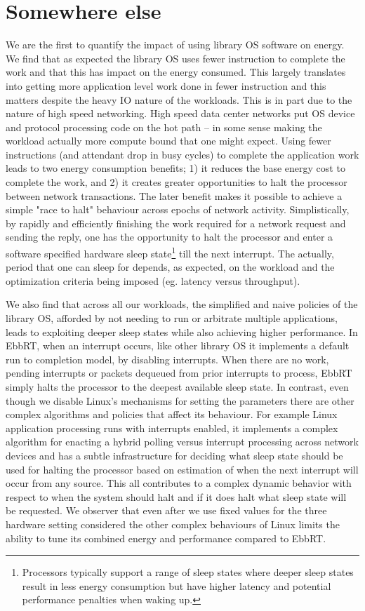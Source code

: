 \section{Somewhere else}
We are the first to quantify the impact of using library OS software on energy.  We find that as expected the library OS uses fewer instruction to complete the work and that this has impact on the energy consumed.  This largely translates into getting more application level work done in fewer instruction and this matters despite the heavy IO nature of the workloads.  This is in part due to the nature of high speed networking.  High speed data center networks put OS device and protocol processing code on the hot path -- in some sense making the workload actually more compute bound that one might expect.  Using fewer instructions (and attendant drop in busy cycles) to complete the application work leads to two energy consumption benefits; 1) it reduces the base energy cost to complete the work, and 2) it creates greater opportunities to halt the processor between network transactions.  The later benefit makes it possible to achieve a simple "race to halt" behaviour across epochs of network activity.  
Simplistically, by rapidly and efficiently finishing the work required for a network request and sending the reply, one has the opportunity to halt the processor and enter a software specified hardware sleep state\footnote{Processors typically support a range of sleep states where deeper sleep states result in less energy consumption but have higher latency and potential performance penalties when waking up.} till the next interrupt.  The actually, period that one can sleep for depends, as expected, on the workload and the optimization criteria being imposed (eg. latency versus throughput).   

We also find that across all our workloads, the simplified and naive policies of the library OS, afforded by not needing to run or arbitrate multiple applications, leads to exploiting deeper sleep states while also achieving higher performance.  In EbbRT, when an interrupt occurs, like other library OS it implements a default run to completion model, by disabling interrupts.  When there are no work,  pending interrupts or packets dequeued from prior interrupts to process, EbbRT simply halts the processor to the deepest available sleep state. In contrast, even though we disable Linux's mechanisms for setting the parameters there are other complex algorithms and policies that affect its behaviour.  For example Linux application processing runs with interrupts enabled, it implements a complex algorithm for enacting a hybrid polling versus interrupt processing across network devices and has a subtle infrastructure for deciding what sleep state should be used for halting the processor based on estimation of when the next interrupt will occur from any source.  This all contributes to a complex dynamic behavior with respect to when the system should halt and if it does halt what sleep state will be requested.  We observer that even after we use fixed values for the three  hardware setting considered the other complex behaviours of Linux limits the ability to tune its combined energy and performance compared to EbbRT.



